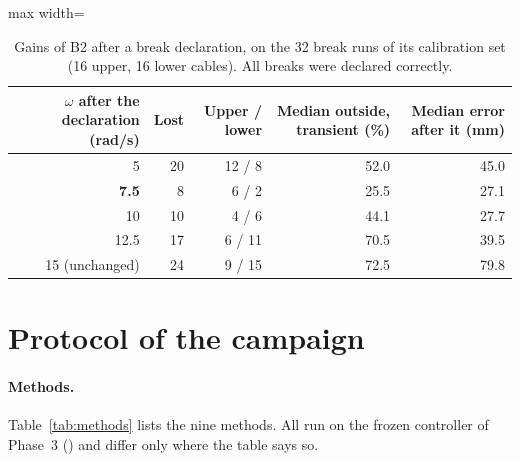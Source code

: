 \documentclass[10pt]{article}
\begin{document}
\begin{table}[h]
\centering\small
\caption{Gains of B2 after a break declaration, on the 32 break runs of its calibration set (16 upper, 16 lower cables). All breaks were declared correctly.}\label{tab:b2post}
\begin{adjustbox}{max width=\linewidth}\begin{tabular}{@{}rrrrr@{}}
\toprule
$\omega$ after the declaration (rad/s) & Lost & Upper / lower & Median outside, transient (\%) & Median error after it (mm) \\
\midrule
5 & 20 & 12 / 8 & 52.0 & 45.0 \\
\textbf{7.5} & 8 & 6 / 2 & 25.5 & 27.1 \\
10 & 10 & 4 / 6 & 44.1 & 27.7 \\
12.5 & 17 & 6 / 11 & 70.5 & 39.5 \\
15 (unchanged) & 24 & 9 / 15 & 72.5 & 79.8 \\
\bottomrule
\end{tabular}\end{adjustbox}
\end{table}

\section{Protocol of the campaign}\label{sec:protocol}

\paragraph{Methods.} Table~\ref{tab:methods} lists the nine methods. All run on the frozen controller of Phase~3 () and differ only where the table says so.
\end{document}
